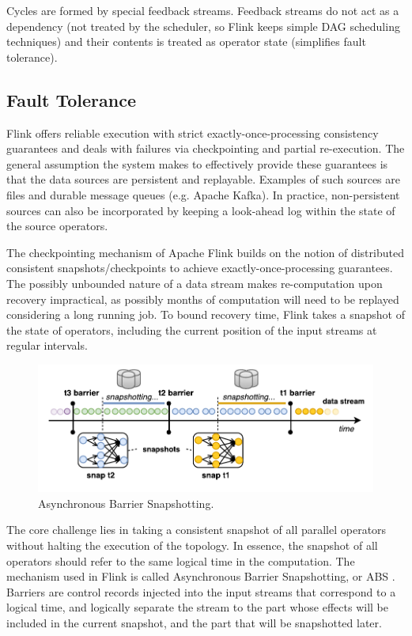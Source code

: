 Cycles are formed by special feedback streams. Feedback streams do not act as a dependency (not treated by the scheduler, so Flink keeps simple DAG scheduling techniques) and their contents is treated as operator state (simplifies fault tolerance). 

\subsection{Fault Tolerance}

\label{sec:fault-tolerance}
Flink offers reliable execution with strict exactly-once-processing consistency guarantees and deals with failures via checkpointing and partial re-execution. The general assumption the system makes to effectively provide these guarantees is that the data sources are persistent and replayable. Examples of such sources are files and durable message queues (e.g. Apache Kafka). In practice, non-persistent sources can also be incorporated by keeping a look-ahead log within the state of the source operators.

The checkpointing mechanism of Apache Flink builds on the notion of distributed consistent snapshots/checkpoints to achieve exactly-once-processing guarantees. The possibly unbounded nature of a data stream makes re-computation upon recovery impractical, as possibly months of computation will need to be replayed considering a long running job. To bound recovery time, Flink takes a snapshot of the state of operators, including the current position of the input streams at regular intervals.

\begin{figure}[t!]
	\centering  	
  	\includegraphics[width=.75\textwidth]{figs/snaps.pdf}
  	\vspace{-6mm}
	\caption{Asynchronous Barrier Snapshotting.}
	\vspace{-2mm}
	\label{fig:snapshots}
\end{figure}

The core challenge lies in taking a consistent snapshot of all parallel operators without halting the execution of the topology. In essence, the snapshot of all operators should refer to the same logical time in the computation. The mechanism used in Flink is called Asynchronous Barrier Snapshotting, or ABS \cite{carbone2015lightweight}. Barriers are control records injected into the input streams that correspond to a logical time, and logically separate the stream to the part whose effects will be included in the current snapshot, and the part that will be snapshotted later.

